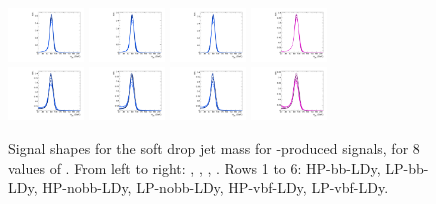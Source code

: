 \begin{figure}[htbp]
  \includegraphics[width=0.18\textwidth]{fig/2Dfit/templateSignalVsMX_fromDC_VBFGbuToWW_MJJ_mu_HP_vbf_LDy.pdf}
  \includegraphics[width=0.18\textwidth]{fig/2Dfit/templateSignalVsMX_fromDC_VBFRadToWW_MJJ_mu_HP_vbf_LDy.pdf}
  \includegraphics[width=0.18\textwidth]{fig/2Dfit/templateSignalVsMX_fromDC_VBFZprToWW_MJJ_mu_HP_vbf_LDy.pdf}
  \includegraphics[width=0.18\textwidth]{fig/2Dfit/templateSignalVsMX_fromDC_VBFWprToWZ_MJJ_mu_HP_vbf_LDy.pdf}\\
  \includegraphics[width=0.18\textwidth]{fig/2Dfit/templateSignalVsMX_fromDC_VBFGbuToWW_MJJ_mu_LP_vbf_LDy.pdf}
  \includegraphics[width=0.18\textwidth]{fig/2Dfit/templateSignalVsMX_fromDC_VBFRadToWW_MJJ_mu_LP_vbf_LDy.pdf}
  \includegraphics[width=0.18\textwidth]{fig/2Dfit/templateSignalVsMX_fromDC_VBFZprToWW_MJJ_mu_LP_vbf_LDy.pdf}
  \includegraphics[width=0.18\textwidth]{fig/2Dfit/templateSignalVsMX_fromDC_VBFWprToWZ_MJJ_mu_LP_vbf_LDy.pdf}\\
  \caption{
    Signal shapes for the soft drop jet mass \MJ for \VBF-produced signals, for 8 values of \MX.
    From left to right: \GBulktoWW, \RadtoWW, \ZprtoWW, \WprtoWZ.
    Rows 1 to 6: HP-bb-LDy, LP-bb-LDy, HP-nobb-LDy, LP-nobb-LDy, HP-vbf-LDy, LP-vbf-LDy.
  }
  \label{fig:MJJShapes_VBF_LDy_Run2}
\end{figure}

